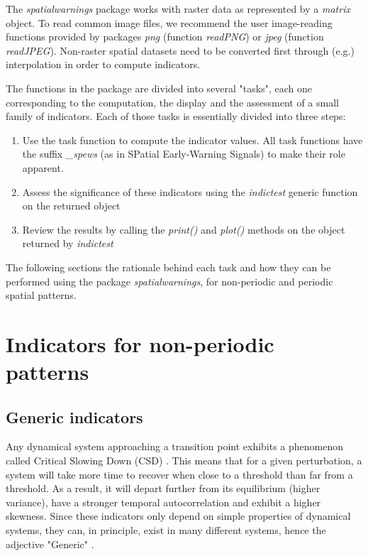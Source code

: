 \documentclass{article}
\begin{document}

The \emph{spatialwarnings} package works with raster data as represented by a 
\emph{matrix} object. To read common image files, we recommend the user 
image-reading functions provided by packages \emph{png} (function \emph{readPNG}) 
or \emph{jpeg} (function \emph{readJPEG}). Non-raster spatial datasets need to 
be converted first through (e.g.) interpolation in order to compute indicators.

The functions in the package are divided into several "tasks", each one 
corresponding to the computation, the display and the assessment of a 
small family of indicators. Each of those tasks is essentially divided into 
three steps: 
  
  \begin{enumerate}
    \item Use the task function to compute the indicator values. All task 
      functions have the suffix \emph{\_spews} (as in SPatial Early-Warning 
      Signals) to make their role apparent. 
    
    \item Assess the significance of these indicators using the \emph{indictest}
      generic function on the returned object
      
    \item Review the results by calling the \emph{print()} and \emph{plot()} 
      methods on the object returned by \emph{indictest}

  \end{enumerate}

The following sections the rationale behind each task and how they can be 
performed using the package \emph{spatialwarnings}, for non-periodic and 
periodic spatial patterns. 

\section{Indicators for non-periodic patterns}

  \subsection{Generic indicators}

Any dynamical system approaching a transition point exhibits a phenomenon 
called Critical Slowing Down (CSD) \citep{kefi2013}. This means that for a given
perturbation, a system will take more time to recover when close to a threshold
than far from a threshold. As a result, it will depart further from its 
equilibrium (higher variance), have a stronger temporal autocorrelation and 
exhibit a higher skewness. Since these indicators only depend on simple 
properties of dynamical systems, they can, in principle, exist in many 
different systems, hence the adjective "Generic" \citep{scheffer2012}. 
\end{document}
